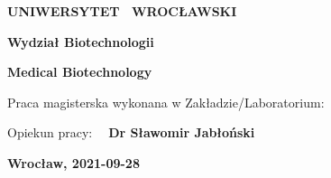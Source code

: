 \documentclass[fontsize=12pt,headsepline=true, bibliography=totocnumbered, twoside]{scrbook} %
\begin{document}



\begin{titlepage}

    \begin{center}     
        \vspace*{1cm}
        \Huge 
        \textbf{UNIWERSYTET ~WROC\L{}AWSKI}
        
        
        \LARGE 
        \textbf{Wydział Biotechnologii}

		\Large 
		\textbf{Medical Biotechnology}
            
        \vspace{3.5cm}
            
       {} %
       
       \vspace{1.5cm}
       
       {} %
            
        \vspace{4cm}

{\Large  Praca magisterska wykonana w Zakładzie/Laboratorium: }



{\color {Blue}{\Large \bfseries Zakład Biotransformacji}} %

\Large Opiekun pracy:{\color {Blue} \Large \bfseries ~ Dr Sławomir Jabłoński} %
   
\vspace{3.5cm}

\LARGE \bfseries Wrocław, 2021-09-28   %
       
           
\end{center}            
    
\end{titlepage}






 
\end{document}
